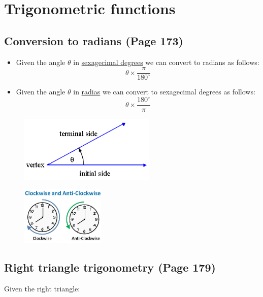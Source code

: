 \section{Trigonometric functions}\label{sec:trigonometric-functions}

\subsection{Conversion to radians (Page 173)}

\begin{multicols}{2}

    \begin{itemize}
        \item Given the angle $\theta$ in \underline{sexagecimal degrees} we can convert to radians as follows:
        \[
            \theta \times \dfrac{\pi}{180^\circ}
        \]
        \item Given the angle $\theta$ in \underline{radias} we can convert to sexagecimal degrees as follows:
        \[
            \theta \times \dfrac{180^\circ}{\pi}
        \]
    \end{itemize}

    \begin{figure}[H]
        \centering
        \includegraphics[width=6.5cm]{images/angle}
    \end{figure}

    \begin{figure}[H]
        \centering
        \includegraphics[width=4cm]{images/img}
    \end{figure}
\end{multicols}



\subsection{Right triangle trigonometry (Page 179)}
Given the right triangle:

